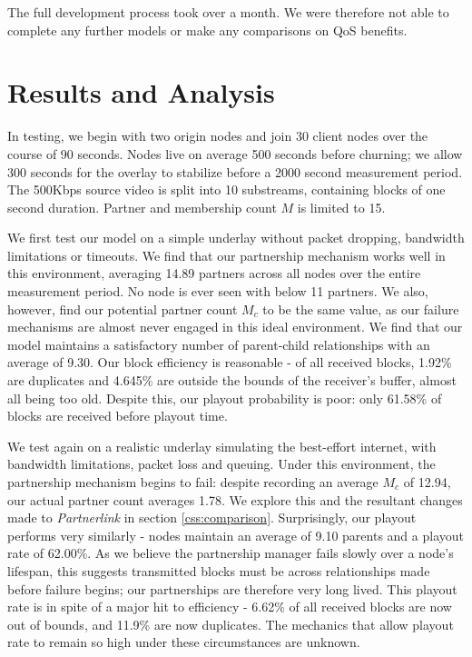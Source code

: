 \documentclass[12pt,a4paper]{article}
\begin{document}
The full development process took over a month. We were therefore not able to complete any further models or make any comparisons on QoS benefits.

\section{Results and Analysis} \label{results}
In testing, we begin with two origin nodes and join 30 client nodes over the course of 90 seconds. Nodes live on average 500 seconds before churning; we allow 300 seconds for the overlay to stabilize before a 2000 second measurement period. The 500Kbps source video is split into 10 substreams, containing blocks of one second duration. Partner and membership count \(M\) is limited to 15.

We first test our model on a simple underlay without packet dropping, bandwidth limitations or timeouts. We find that our partnership mechanism works well in this environment, averaging 14.89 partners across all nodes over the entire measurement period. No node is ever seen with below 11 partners. We also, however, find our potential partner count \(M_c\) to be the same value, as our failure mechanisms are almost never engaged in this ideal environment. We find that our model maintains a satisfactory number of parent-child relationships with an average of 9.30. Our block efficiency is reasonable - of all received blocks, 1.92\% are duplicates and 4.645\% are outside the bounds of the receiver's buffer, almost all being too old. Despite this, our playout probability is poor: only 61.58\% of blocks are received before playout time.

We test again on a realistic underlay simulating the best-effort internet, with bandwidth limitations, packet loss and queuing. Under this environment, the partnership mechanism begins to fail: despite recording an average \(M_c\) of 12.94, our actual partner count averages 1.78. We explore this and the resultant changes made to \textit{Partnerlink} in section \ref{css:comparison}. Surprisingly, our playout performs very similarly - nodes maintain an average of 9.10 parents and a playout rate of 62.00\%. As we believe the partnership manager fails slowly over a node's lifespan, this suggests transmitted blocks must be across relationships made before failure begins; our partnerships are therefore very long lived. This playout rate is in spite of a major hit to efficiency - 6.62\% of all received blocks are now out of bounds, and 11.9\% are now duplicates. The mechanics that allow playout rate to remain so high under these circumstances are unknown.
\end{document}
